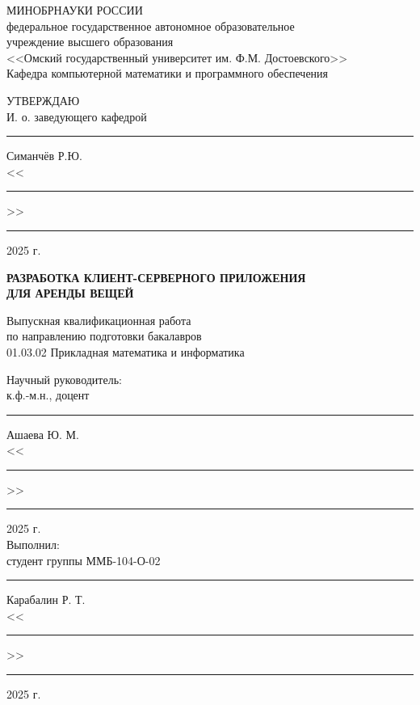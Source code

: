 \documentclass[14pt]{extarticle}
\begin{document}
\setcounter{secnumdepth}{0}

\thispagestyle{empty}
\begin{titlepage}
    \begin{center}
        МИНОБРНАУКИ РОССИИ\\
        федеральное государственное автономное образовательное\\
        учреждение высшего образования\\
        <<Омский государственный университет им. Ф.М. Достоевского>>\\
        Кафедра компьютерной математики и программного обеспечения\\
        
        \bigskip
        \bigskip
        \bigskip
        
        \begin{adjustwidth}{10cm}{}
            УТВЕРЖДАЮ\\
            И. о. заведующего кафедрой\\
            \rule{3cm}{0.4pt} Симанчёв Р.Ю.\\
            \bigskip
            <<\rule{1cm}{0.4pt}>> \rule{3cm}{0.4pt} 2025 г.\\
        \end{adjustwidth}
        
        \bigskip
        \bigskip
        \bigskip
        
        \textbf{РАЗРАБОТКА КЛИЕНТ-СЕРВЕРНОГО ПРИЛОЖЕНИЯ}\\
        \textbf{ДЛЯ АРЕНДЫ ВЕЩЕЙ}\\
        
        \bigskip
        \bigskip
        
        Выпускная квалификационная работа\\
        по направлению подготовки бакалавров\\
        01.03.02 Прикладная математика и информатика\\
        
        \bigskip
        \bigskip
        \bigskip
        \bigskip
        \bigskip
        \bigskip

        \begin{adjustwidth}{10cm}{}
            Научный руководитель:\\
            к.ф.-м.н., доцент\\
            \rule{3cm}{0.4pt} Ашаева Ю. М.\\
            \bigskip
            <<\rule{1cm}{0.4pt}>> \rule{3cm}{0.4pt} 2025 г.\\
            \bigskip
            \bigskip
            Выполнил:\\
            студент группы ММБ-104-О-02\\
            \rule{3cm}{0.4pt} Карабалин Р. Т.\\
            \bigskip
            <<\rule{1cm}{0.4pt}>> \rule{3cm}{0.4pt} 2025 г.\\
        \end{adjustwidth}


\end{center}
\end{titlepage}
\end{document}
